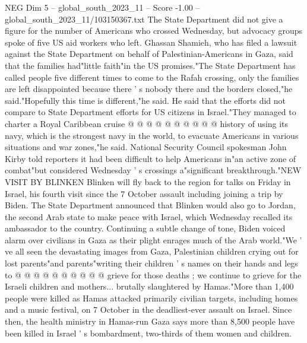 \begin{textsample}{NEG Dim 5 – global\_south\_2023\_11 – Score -1.00 – global\_south\_2023\_11/103150367.txt}
The State Department did not give a figure for the number of Americans who crossed Wednesday, but advocacy groups spoke of five US aid workers who left.
Ghassan Shamieh, who has filed a lawsuit against the State Department on behalf of Palestinian-Americans in Gaza, said that the families had"little faith"in the US promises."The State Department has called people five different times to come to the Rafah crossing, only the families are left disappointed because there ' s nobody there and the borders closed,"he said."Hopefully this time is different,"he said.
He said that the efforts did not compare to State Department efforts for US citizens in Israel."They managed to charter a Royal Caribbean cruise @ @ @ @ @ @ @ @ @ @ history of using its navy, which is the strongest navy in the world, to evacuate Americans in various situations and war zones,"he said.
National Security Council spokesman John Kirby told reporters it had been difficult to help Americans in"an active zone of combat"but considered Wednesday ' s crossings a"significant breakthrough."NEW VISIT BY BLINKEN Blinken will fly back to the region for talks on Friday in Israel, his fourth visit since the 7 October assault including joining a trip by Biden.
The State Department announced that Blinken would also go to Jordan, the second Arab state to make peace with Israel, which Wednesday recalled its ambassador to the country.
Continuing a subtle change of tone, Biden voiced alarm over civilians in Gaza as their plight enrages much of the Arab world."We ' ve all seen the devastating images from Gaza, Palestinian children crying out for lost parents"and parents"writing their children ' s names on their hands and legs to @ @ @ @ @ @ @ @ @ @ grieve for those deaths ; we continue to grieve for the Israeli children and mothers... brutally slaughtered by Hamas."More than 1,400 people were killed as Hamas attacked primarily civilian targets, including homes and a music festival, on 7 October in the deadliest-ever assault on Israel.
Since then, the health ministry in Hamas-run Gaza says more than 8,500 people have been killed in Israel ' s bombardment, two-thirds of them women and children.

\end{textsample}

